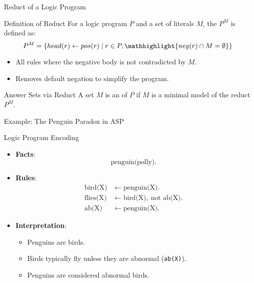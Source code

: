 \begin{frame}{Reduct of a Logic Program}
    \begin{block}{Definition of Reduct}
        For a logic program \(P\) and a set of literals \(M\), the  \(P^M\) is defined as:
        \[
            P^M = \{head(r) \leftarrow pos(r) \mid r \in P, \mathhighlight{neg(r) \cap M = \emptyset}\}
        \]
        \begin{itemize}
            \item All rules where the negative body is not contradicted by \(M\).
            \item Removes default negation to simplify the program.
        \end{itemize}
    \end{block}
    \begin{block}{Answer Sets via Reduct}
        A set \(M\) is an  of \(P\) if \(M\) is a minimal model of the reduct \(P^M\).
    \end{block}
\end{frame}

\begin{frame}{Example: The Penguin Paradox in ASP}
    \begin{exampleblock}{Logic Program Encoding}
        \begin{itemize}
            \item \textbf{Facts}:
                  \[
                      \text{penguin(polly)}.
                  \]
            \item \textbf{Rules}:
                  \begin{align*}
                      \text{bird(X)}  & \leftarrow \text{penguin(X)}.                          \\
                      \text{flies(X)} & \leftarrow \text{bird(X)}, \ \text{not } \text{ab(X)}. \\
                      \text{ab(X)}    & \leftarrow \text{penguin(X)}.
                  \end{align*}
            \item \textbf{Interpretation}:
                  \begin{itemize}
                      \item Penguins are birds.
                      \item Birds typically fly unless they are abnormal (\texttt{ab(X)}).
                      \item Penguins are considered abnormal birds.
                  \end{itemize}
        \end{itemize}
    \end{exampleblock}
\end{frame}


